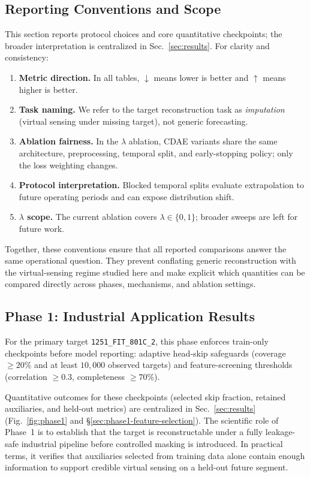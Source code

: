 \subsection{Reporting Conventions and Scope}\label{sec:reporting_scope}
This section reports protocol choices and core quantitative checkpoints; the broader interpretation is centralized in Sec.~\ref{sec:results}. For clarity and consistency:
\begin{enumerate}
    \item \textbf{Metric direction.} In all tables, $\downarrow$ means lower is better and $\uparrow$ means higher is better.
    \item \textbf{Task naming.} We refer to the target reconstruction task as \emph{imputation} (virtual sensing under missing target), not generic forecasting.
    \item \textbf{Ablation fairness.} In the $\lambda$ ablation, CDAE variants share the same architecture, preprocessing, temporal split, and early-stopping policy; only the loss weighting changes.
    \item \textbf{Protocol interpretation.} Blocked temporal splits evaluate extrapolation to future operating periods and can expose distribution shift.
    \item \textbf{$\lambda$ scope.} The current ablation covers $\lambda\in\{0,1\}$; broader sweeps are left for future work.
\end{enumerate}
Together, these conventions ensure that all reported comparisons answer the same operational question. They prevent conflating generic reconstruction with the virtual-sensing regime studied here and make explicit which quantities can be compared directly across phases, mechanisms, and ablation settings.

\subsection{Phase 1: Industrial Application Results}\label{sec:phase1}
For the primary target \texttt{1251\_FIT\_801C\_2}, this phase enforces train-only checkpoints before model reporting: adaptive head-skip safeguards (coverage $\ge 20\%$ and at least $10{,}000$ observed targets) and feature-screening thresholds (correlation $\ge 0.3$, completeness $\ge 70\%$).

Quantitative outcomes for these checkpoints (selected skip fraction, retained auxiliaries, and held-out metrics) are centralized in Sec.~\ref{sec:results} (Fig.~\ref{fig:phase1} and \S\ref{sec:phase1-feature-selection}).
The scientific role of Phase~1 is to establish that the target is reconstructable under a fully leakage-safe industrial pipeline before controlled masking is introduced. In practical terms, it verifies that auxiliaries selected from training data alone contain enough information to support credible virtual sensing on a held-out future segment.


